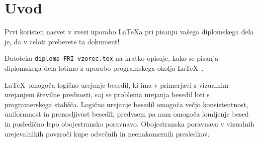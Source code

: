 \documentclass[a4paper,12pt,openright]{book}
\begin{document}

\newcommand{\tpovzetek}
{V vzorcu je predstavljen postopek priprave diplomskega dela z uporabo okolja \LaTeX. Vaš povzetek mora sicer vsebovati med približno 100 in 200 besed, ta tukaj je odločno prekratek.
Dober povzetek je kot mini diploma in vključuje: (1) kratek opis stanja tehnike in kaj so glavne težave oz. opis obravnavanega problema, (2) kako ste ta problem naslovili oz. kratek opis vašega pristopa za reševanje tega problema in (3) (najbolj uspešen) rezultat ali prispevek diplomske naloge.}

\newcommand{\tabstract}
{This sample document presents the process of preparing a thesis using the \LaTeX\ environment. Your abstract should otherwise contain between approximately 100 and 200 words; the one provided here is far too short. A good abstract is like a mini-thesis and includes: (1) a brief description of the state of the art and the main issues or a description of the problem addressed, (2) how you addressed this problem or a brief description of your approach to solving it, and (3) the (most successful) result or contribution of the thesis.}



\mainmatter
\setcounter{page}{1}
\pagestyle{fancy}


\chapter{Uvod}
Prvi koristen nasvet v zvezi uporabo \LaTeX{a} pri pisanju vašega diplomskega dela je, da v celoti preberete ta dokument!

Datoteka {\tt diploma-FRI-vzorec.tex} na kratko opisuje, kako se pisanja diplomskega dela lotimo z uporabo programskega okolja \LaTeX~\cite{lamport,nenajkrajsi}.

\LaTeX\ omogoča logično urejanje besedil, ki ima v primerjavi z vizualnim urejanjem številne prednosti, saj se problema urejanja besedil loti s programerskega stališča.
Logično urejanje besedil omogoča večjo konsistentnost, uniformnost in prenosljivost besedil, predvsem pa nam omogoča lomljenje besed in posledično lepo obojestransko poravnavo. Obojestranska poravnava v vizualnih urejevalnikih povzroči kupe odvečnih in neenakomernih presledkov. 
\end{document}
